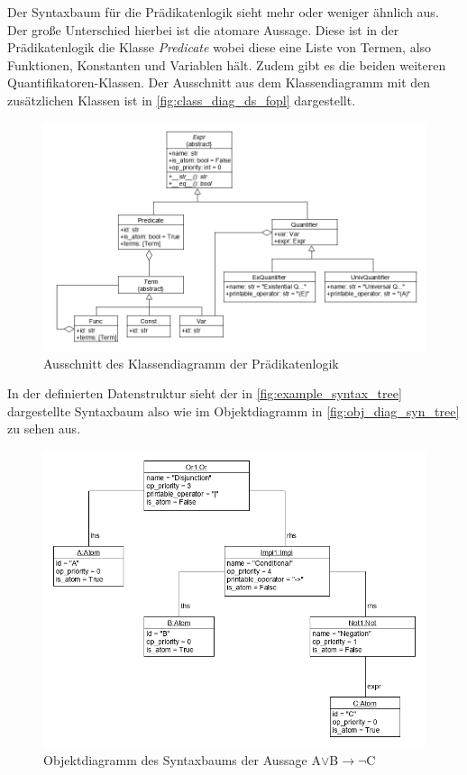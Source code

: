 Der Syntaxbaum für die Prädikatenlogik sieht mehr oder weniger ähnlich aus. Der große Unterschied hierbei ist die atomare Aussage. Diese ist in der Prädikatenlogik die Klasse \textit{Predicate} wobei diese eine Liste von Termen, also Funktionen, Konstanten und Variablen hält. Zudem gibt es die beiden weiteren Quantifikatoren-Klassen. Der Ausschnitt aus dem Klassendiagramm mit den zusätzlichen Klassen ist in \autoref{fig:class_diag_ds_fopl} dargestellt.

\begin{figure}[H]
\begin{center}
\includegraphics[scale=0.5]{images/class_diag_ds_fopl.png}
\caption{Ausschnitt des Klassendiagramm der Prädikatenlogik}
\label{fig:class_diag_ds_fopl}
\end{center}
\end{figure}

In der definierten Datenstruktur sieht der in \autoref{fig:example_syntax_tree} dargestellte Syntaxbaum also wie im Objektdiagramm in \autoref{fig:obj_diag_syn_tree} zu sehen aus.

\begin{figure}[H]
\begin{center}
\includegraphics[scale=0.5]{images/obj_diag_syn_tree.png}
\caption{Objektdiagramm des Syntaxbaums der Aussage A$\vee$B$\rightarrow\neg$C}
\label{fig:obj_diag_syn_tree}
\end{center}
\end{figure}


